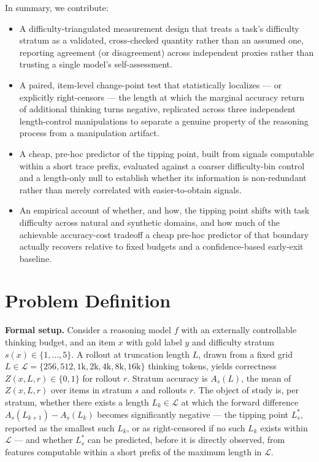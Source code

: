 \documentclass[11pt]{article}
\begin{document}
In summary, we contribute:
\begin{itemize}[leftmargin=1.4em]
\item A difficulty-triangulated measurement design that treats a task's difficulty stratum as a validated, cross-checked quantity rather than an assumed one, reporting agreement (or disagreement) across independent proxies rather than trusting a single model's self-assessment.
\item A paired, item-level change-point test that statistically localizes --- or explicitly right-censors --- the length at which the marginal accuracy return of additional thinking turns negative, replicated across three independent length-control manipulations to separate a genuine property of the reasoning process from a manipulation artifact.
\item A cheap, pre-hoc predictor of the tipping point, built from signals computable within a short trace prefix, evaluated against a coarser difficulty-bin control and a length-only null to establish whether its information is non-redundant rather than merely correlated with easier-to-obtain signals.
\item An empirical account of whether, and how, the tipping point shifts with task difficulty across natural and synthetic domains, and how much of the achievable accuracy-cost tradeoff a cheap pre-hoc predictor of that boundary actually recovers relative to fixed budgets and a confidence-based early-exit baseline.
\end{itemize}

\section{Problem Definition}

\noindent\textbf{Formal setup.} Consider a reasoning model $f$ with an externally controllable thinking budget, and an item $x$ with gold label $y$ and difficulty stratum $s(x) \in \{1,\dots,5\}$. A rollout at truncation length $L$, drawn from a fixed grid $L \in \mathcal{L} = \{256, 512, 1\text{k}, 2\text{k}, 4\text{k}, 8\text{k}, 16\text{k}\}$ thinking tokens, yields correctness $Z(x,L,r) \in \{0,1\}$ for rollout $r$. Stratum accuracy is $A_s(L)$, the mean of $Z(x,L,r)$ over items in stratum $s$ and rollouts $r$. The object of study is, per stratum, whether there exists a length $L_k \in \mathcal{L}$ at which the forward difference $A_s(L_{k+1}) - A_s(L_k)$ becomes significantly negative --- the tipping point $L^*_s$, reported as the smallest such $L_k$, or as right-censored if no such $L_k$ exists within $\mathcal{L}$ --- and whether $L^*_s$ can be predicted, before it is directly observed, from features computable within a short prefix of the maximum length in $\mathcal{L}$.
\end{document}
